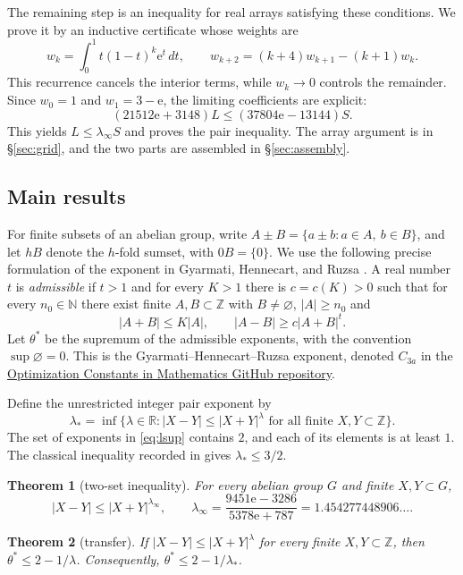 \documentclass[11pt]{amsart}
\newtheorem{theorem}{Theorem}[section]
\theoremstyle{definition}
\theoremstyle{remark}
\numberwithin{equation}{section}
\newcommand{\N}{\mathbb{N}}
\newcommand{\Z}{\mathbb{Z}}
\newcommand{\R}{\mathbb{R}}
\newcommand{\e}{\mathrm{e}}
\newcommand{\lamI}{\lambda_\infty}
\newcommand{\lsup}{\lambda_*}
\begin{document}
The remaining step is an inequality for real arrays satisfying these
conditions. We prove it by an inductive certificate whose weights are
\[
 w_k=\int_0^1t(1-t)^k\e^t\,dt,\qquad
 w_{k+2}=(k+4)w_{k+1}-(k+1)w_k.
\]
This recurrence cancels the interior terms, while $w_k\to0$ controls
the remainder. Since $w_0=1$ and $w_1=3-\e$, the limiting coefficients
are explicit:
\[
 (21512\e+3148)L\le(37804\e-13144)S.
\]
This yields $L\le\lamI S$ and proves the pair inequality. The array
argument is in \S\ref{sec:grid}, and the two parts are assembled in
\S\ref{sec:assembly}.

\subsection{Main results}
For finite subsets of an abelian group, write
$A\pm B=\{a\pm b:a\in A,\ b\in B\}$, and let $hB$ denote the
$h$-fold sumset, with $0B=\{0\}$. We use the following precise
formulation of the exponent in Gyarmati, Hennecart, and Ruzsa
\cite[(5)]{GHR}. A real number $t$ is \emph{admissible} if $t>1$ and
for every $K>1$ there is $c=c(K)>0$ such that for every $n_0\in\N$
there exist finite $A,B\subset\Z$ with $B\ne\varnothing$, $|A|\ge n_0$ and
\begin{equation}\label{eq:adm}
 |A+B|\le K|A|,\qquad |A-B|\ge c|A+B|^t.
\end{equation}
Let $\theta^*$ be the supremum of the admissible exponents, with the
convention $\sup\varnothing=0$. This is the
Gyarmati--Hennecart--Ruzsa exponent, denoted $C_{3a}$ in the
\href{https://teorth.github.io/optimizationproblems/constants/3a.html}{Optimization Constants in Mathematics GitHub repository}.

Define the unrestricted integer pair exponent by
\begin{equation}\label{eq:lsup}
 \lsup=\inf\{\lambda\in\R:
 |X-Y|\le|X+Y|^\lambda\text{ for all finite }X,Y\subset\Z\}.
\end{equation}
The set of exponents in \eqref{eq:lsup} contains $2$, and each of
its elements is at least $1$. The classical inequality recorded in
\cite[\S1]{GHR} gives $\lsup\le3/2$.

\begin{theorem}[two-set inequality]\label{thm:pair}
For every abelian group $G$ and finite $X,Y\subset G$,
\[
 |X-Y|\le|X+Y|^{\lamI},\qquad
 \lamI=\frac{9451\e-3286}{5378\e+787}=1.454277448906\ldots.
\]
\end{theorem}

\begin{theorem}[transfer]\label{thm:transfer}
If $|X-Y|\le|X+Y|^\lambda$ for every finite $X,Y\subset\Z$, then
$\theta^*\le2-1/\lambda$. Consequently,
$\theta^*\le2-1/\lsup$.
\end{theorem}
\end{document}
